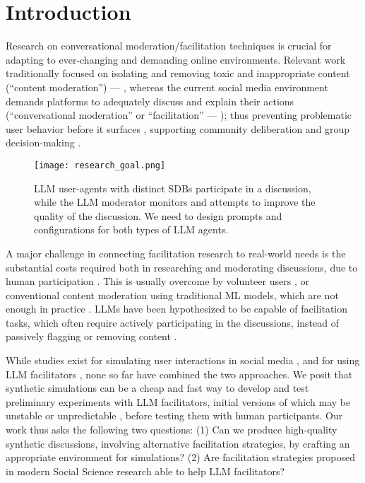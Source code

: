 %
\section{Introduction}
\label{sec:introduction}

Research on conversational moderation/facilitation techniques is crucial for adapting to ever-changing and demanding online environments. Relevant work traditionally focused on isolating and removing toxic and inappropriate content (``content moderation'') --- \citet{seering_self_moderation, cresci_pesonalized_interventions}, whereas the current social media environment demands platforms to adequately discuss and explain their actions (``conversational moderation'' or ``facilitation'' --- \citet{argyle2023, korre2025evaluation, falk-etal-2021-predicting}); thus preventing problematic user behavior before it surfaces \cite{cho-etal-2024-language, seering_self_moderation, cresci_pesonalized_interventions, make_reddit_great}, supporting community deliberation and group decision-making \cite{kim_et_al_chatbot, seering_self_moderation}.

\begin{figure}[t]
	\centering
	\texttt{[image: research\_goal.png]}
	\caption{\ac{LLM} user-agents with distinct \acp{SDB} participate in a discussion, while the \ac{LLM} moderator monitors and attempts to improve the quality of the discussion. We need to design prompts and configurations for both types of \ac{LLM} agents.}
	\label{fig::goals}
\end{figure}

A major challenge in connecting facilitation research to real-world needs is the substantial costs required both in researching and moderating discussions, due to human participation \cite{rossi_2024}. This is usually overcome by volunteer users \cite{Matias2019TheCL, schaffner_community_guidelines}, or conventional content moderation using traditional \ac{ML} models, which are not enough in practice \cite{horta_automated_moderation, schaffner_community_guidelines}. \acfp{LLM} have been hypothesized to be capable of facilitation tasks, which often require actively participating in the discussions, instead of passively flagging or removing content \cite{small-polis-llm, korre2025evaluation}. 

While studies exist for simulating user interactions in social media \cite{park_simulacra, mou_2024, tornberg_2023, y_social, balog_2024}, and for using \ac{LLM} facilitators \cite{kim_et_al_chatbot, cho-etal-2024-language}, none so far have combined the two approaches. We posit that synthetic simulations can be a cheap and fast way to develop and test preliminary experiments with \ac{LLM} facilitators, initial versions of which may be unstable or unpredictable \cite{atil_2025, rossi_2024}, before testing them with human participants. Our work thus asks the following two questions: (1) Can we produce high-quality synthetic discussions, involving alternative facilitation strategies, by crafting an appropriate environment for simulations? (2) Are facilitation strategies proposed in modern Social Science research able to help \ac{LLM} facilitators?

